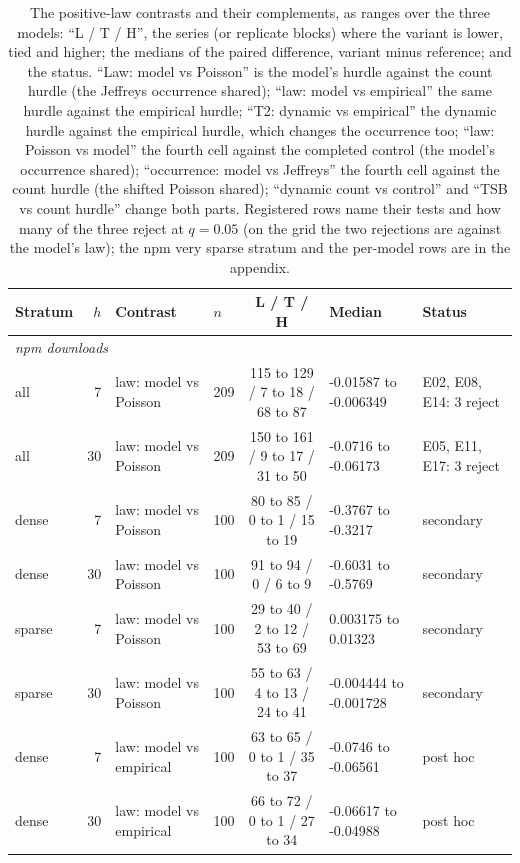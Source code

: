 \begin{table}[p]
\centering\scriptsize\setlength{\tabcolsep}{2pt}
\renewcommand{\arraystretch}{0.92}\setlength{\abovecaptionskip}{0pt}
\caption{The positive-law contrasts and their complements, as ranges over the three models: ``L / T / H'',
the series (or replicate blocks) where the variant is lower, tied and higher; the medians of the paired
\qs{} difference, variant minus reference; and the status. ``Law: model vs Poisson'' is the model's hurdle
against the count hurdle (the Jeffreys occurrence shared); ``law: model vs empirical'' the same hurdle against
the empirical hurdle; ``T2: dynamic vs empirical'' the dynamic hurdle against the empirical hurdle, which
changes the occurrence too; ``law: Poisson vs model'' the fourth cell against the completed control (the
model's occurrence shared); ``occurrence: model vs Jeffreys'' the fourth cell against the count hurdle (the
shifted Poisson shared); ``dynamic count vs control'' and
``TSB vs count hurdle'' change both parts. Registered rows name their tests and how many of the three reject at
$q = 0.05$ (on the grid the two rejections are against the model's law); the npm very sparse stratum and the per-model rows are in the appendix.}
\label{tab:pos}
\begin{tabular}{lrllcll}
\toprule
Stratum & $h$ & Contrast & $n$ & L / T / H & Median & Status \\
\midrule
\multicolumn{7}{l}{\emph{npm downloads}} \\
all & 7 & law: model vs Poisson & 209 & 115 to 129 / 7 to 18 / 68 to 87 & -0.01587 to -0.006349 & E02, E08, E14: 3 reject \\
all & 30 & law: model vs Poisson & 209 & 150 to 161 / 9 to 17 / 31 to 50 & -0.0716 to -0.06173 & E05, E11, E17: 3 reject \\
dense & 7 & law: model vs Poisson & 100 & 80 to 85 / 0 to 1 / 15 to 19 & -0.3767 to -0.3217 & secondary \\
dense & 30 & law: model vs Poisson & 100 & 91 to 94 / 0 / 6 to 9 & -0.6031 to -0.5769 & secondary \\
sparse & 7 & law: model vs Poisson & 100 & 29 to 40 / 2 to 12 / 53 to 69 & 0.003175 to 0.01323 & secondary \\
sparse & 30 & law: model vs Poisson & 100 & 55 to 63 / 4 to 13 / 24 to 41 & -0.004444 to -0.001728 & secondary \\
dense & 7 & law: model vs empirical & 100 & 63 to 65 / 0 to 1 / 35 to 37 & -0.0746 to -0.06561 & post hoc \\
dense & 30 & law: model vs empirical & 100 & 66 to 72 / 0 to 1 / 27 to 34 & -0.06617 to -0.04988 & post hoc \\

\end{tabular}
\end{table}
